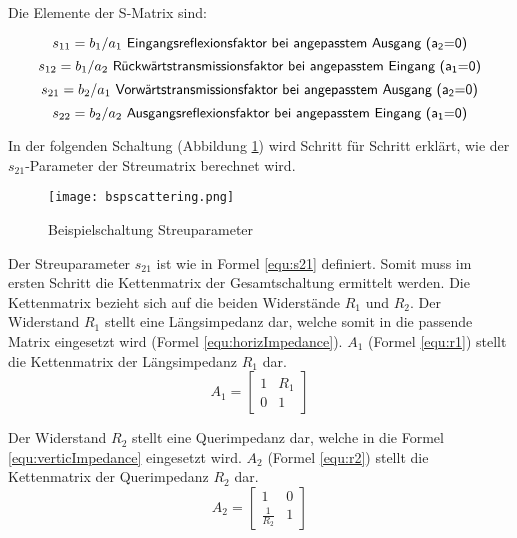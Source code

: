 Die Elemente der S-Matrix sind:

\begin{equation}\label{equ:def_s11}
	s_{11} = b_1/a_1\textsf{ Eingangsreflexionsfaktor bei angepasstem Ausgang (a\textsubscript{2}=0)}
\end{equation}
\begin{equation}\label{equ:def_s12}
	s_{12} = b_1/a_2\textsf{ Rückwärtstransmissionsfaktor bei angepasstem Eingang (a\textsubscript{1}=0)}
\end{equation}
\begin{equation}\label{equ:def_s21}
	s_{21} = b_2/a_1\textsf{ Vorwärtstransmissionsfaktor bei angepasstem Ausgang (a\textsubscript{2}=0)}
\end{equation}
\begin{equation}\label{equ:def_s22}
	s_{22} = b_2/a_2\textsf{ Ausgangsreflexionsfaktor bei angepasstem Eingang (a\textsubscript{1}=0)}
\end{equation}

In der folgenden Schaltung (Abbildung \ref{fig:bspscattering}) wird Schritt für Schritt erklärt, wie der \\ $s_{21}$-Parameter der Streumatrix berechnet wird.
 
\begin{figure}[H]
	\centering
	\texttt{[image: bspscattering.png]}
	\caption{Beispielschaltung Streuparameter}
	\label{fig:bspscattering}
\end{figure}

Der Streuparameter $s_{21}$ ist wie in Formel \ref{equ:s21} definiert. Somit muss im ersten Schritt die Kettenmatrix der Gesamtschaltung ermittelt werden. Die Kettenmatrix bezieht sich auf die beiden Widerstände $R_1$ und $R_2$. Der Widerstand $R_1$ stellt eine Längsimpedanz dar, welche somit in die passende Matrix eingesetzt wird (Formel \ref{equ:horizImpedance}). $A_1$ (Formel \ref{equ:r1}) stellt die Kettenmatrix der Längsimpedanz $R_1$ dar.
\begin{equation}\label{equ:r1}
	A_1 = \left[\begin{matrix}
			1&R_1\\0&1
			\end{matrix}\right]
\end{equation}

Der Widerstand $R_2$ stellt eine Querimpedanz dar, welche in die Formel \ref{equ:verticImpedance} eingesetzt wird. $A_2$ (Formel \ref{equ:r2}) stellt die Kettenmatrix der Querimpedanz $R_2$ dar.
\begin{equation}\label{equ:r2}
			A_2 = \left[\begin{matrix}
			1&0\\\frac{1}{R_2}&1
			\end{matrix}\right]
\end{equation}

